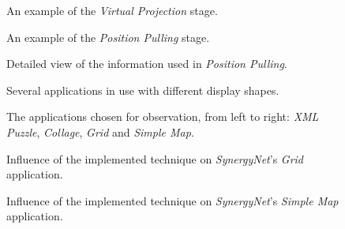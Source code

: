 \documentclass{bmcart}
\begin{document}
\begin{backmatter}
\begin{figure}[h!]
 \centering
   \caption{
   An example of the {\emph{Virtual Projection}} stage.}
   \label{fig:virtualRectangle}
\end{figure}

\begin{figure}[h!] 
 \centering
   \caption{
   An example of the {\emph{Position Pulling}} stage.}
   \label{fig:pullLayout}
\end{figure}

\begin{figure}[h!]
 \centering
   \caption{
   Detailed view of the information used in {\emph{Position Pulling}}.}
   \label{fig:pullLayoutExp}
\end{figure}

\begin{figure}[h!] 
 \centering
  \caption{
  Several applications in use with different display shapes.}
  \label{fig:trial}
\end{figure}


\begin{figure}[h!] 
 \centering
  \caption{
  The applications chosen for observation, from left to right: {\emph{XML Puzzle}}, {\emph{Collage}}, {\emph{Grid}} and {\emph{Simple Map}}.}
  \label{fig:apps}
\end{figure}

\begin{figure}[h!] 
 \centering
  \caption{
  Influence of the implemented technique on {\emph{SynergyNet}}'s {\emph{Grid}} application.}
  \label{fig:gridApp}
\end{figure}

\begin{figure}[h!] 
 \centering
  \caption{
  Influence of the implemented technique on {\emph{SynergyNet}}'s {\emph{Simple Map}} application.}
  \label{fig:mapApp}
\end{figure}


\end{backmatter}
\end{document}
